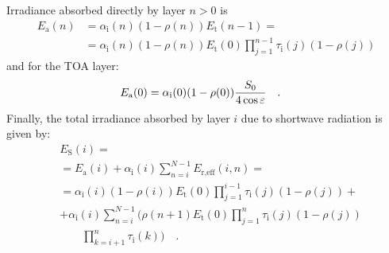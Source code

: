 \documentclass[a4paper,10pt,twocolumn,\classoptions]{article}
\begin{document}
Irradiance absorbed directly by layer $n > 0$ is
\begin{equation}
  \label{eq:irradiance_absorbed}
  \begin{split}
  E_\text{a}(n) & = \alpha_\text{i}(n) (1 - \rho(n)) E_\text{t}(n - 1)
  = \\
  & = \alpha_\text{i}(n) (1 - \rho(n)) E_\text{t}(0) \prod_{j = 1}^{n - 1} \tau_\text{i}(j) (1 - \rho(j))
  \end{split}
\end{equation}
and for the TOA layer:
\begin{equation}
  \label{eq:irradiance_absorbed_0}
  \begin{split}
  E_\text{a}(0) & = \alpha_\text{i}(0) (1 - \rho(0)) \frac{S_0}{4 \cos \varepsilon}
  \quad .
  \end{split}
\end{equation}
Finally, the total irradiance absorbed by layer $i$ due to shortwave radiation is given by:
\begin{equation}
  \label{eq:irradiance_shortwave_derivation}
  \begin{split}
  & E_\text{S}(i) = \\
  & = E_\text{a}(i) + \alpha_\text{i}(i) \sum_{n = i}^{N - 1} E_{\text{r},\text{eff}}(i, n) = \\
  & = \alpha_\text{i}(i) (1 - \rho(i)) E_\text{t}(0) \prod_{j = 1}^{i - 1} \tau_\text{i}(j) (1 - \rho(j)) + \\
  & + \alpha_\text{i}(i) \sum_{n = i}^{N - 1} \bigg( \rho(n + 1) E_\text{t}(0) \prod_{j = 1}^{n} \tau_\text{i}(j) (1 - \rho(j)) \\
  & \qquad \prod_{k = i + 1}^{n} \tau_\text{i}(k) \bigg)
  \quad .
  \end{split}
\end{equation}
\end{document}
